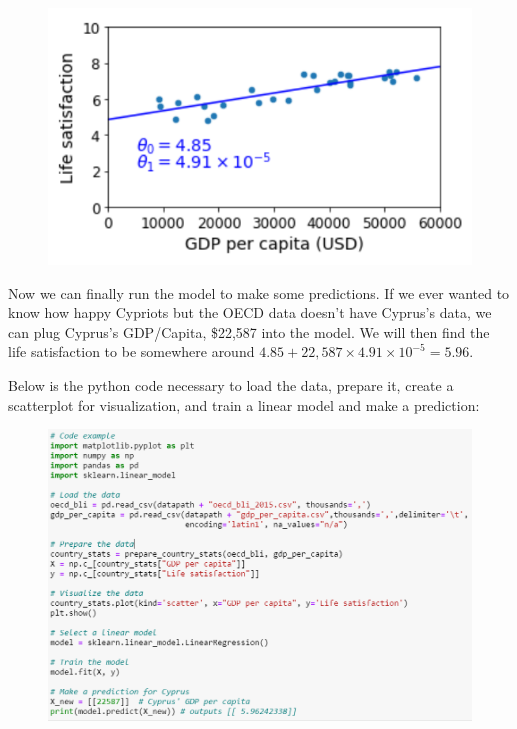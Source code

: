     \begin{figure}[hbt!]
        \centering
        \includegraphics{Resources/Model_based_learning_3}
    \end{figure}

    \noindent Now we can finally run the model to make some predictions. If we ever wanted to know how happy
    Cypriots but the OECD data doesn't have Cyprus's data, we can plug Cyprus's GDP/Capita, \$22,587 into the
    model. We will then find the life satisfaction to be somewhere around
    $4.85+22,587\times 4.91\times 10^{-5}=5.96$. \\

    \pagebreak

    \noindent Below is the python code necessary to load the data, prepare it, create a scatterplot for
    visualization, and train a linear model and make a prediction:

    \begin{figure}[hbt!]
        \centering
        \includegraphics{Resources/Linear_model}
    \end{figure}

